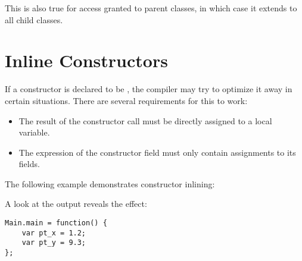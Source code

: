 
This is also true for access granted to parent classes, in which case it extends to all child classes.



\section{Inline Constructors}
\label{lf-inline-constructor}

If a constructor is declared to be , the compiler may try to optimize it away in certain situations. There are several requirements for this to work:

\begin{itemize}
	\item The result of the constructor call must be directly assigned to a local variable.
	\item The expression of the constructor field must only contain assignments to its fields.
\end{itemize}

The following example demonstrates constructor inlining:


A look at the  output reveals the effect:

\begin{lstlisting}
Main.main = function() {
	var pt_x = 1.2;
	var pt_y = 9.3;
};
\end{lstlisting}
